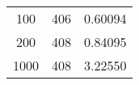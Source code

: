 \documentclass[12pt]{article}
\begin{document}
\begin{table}[]
\begin{tabular}{ccc}
100                            & 406                                                                          & 0.60094                                                                              \\
200                            & 408                                                                          & 0.84095                                                                              \\
1000                           & 408                                                                          & 3.22550                                                                             
\end{tabular}
\end{table}
\end{document}
